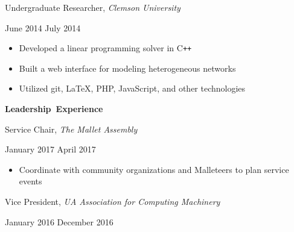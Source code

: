 \documentclass[11pt]{article}
\begin{document}
\begin{minipage}[t]{0.65\textwidth}
\flushleft
Undergraduate Researcher, \textit{Clemson University}\\
\end{minipage}
\begin{minipage}[t]{0.30\textwidth}
\flushright
June 2014 \space \textemdash \space July 2014\\
\end{minipage}

\begin{itemize}
  \item Developed a linear programming solver in C\texttt{++}
  \item Built a web interface for modeling heterogeneous networks
  \item Utilized git, \LaTeX, PHP, JavaScript, and other technologies
\end{itemize}

\vspace{0.8em}
\hbox{\large \textbf{Leadership Experience}}

\vspace{0.4em}
\begin{minipage}[t]{0.65\textwidth}
\flushleft
Service Chair, \textit{The Mallet Assembly}\\
\end{minipage}
\begin{minipage}[t]{0.30\textwidth}
\flushright
January 2017 \space \textemdash \space April 2017\\
\end{minipage}

\begin{itemize}
  \item Coordinate with community organizations and Malleteers to plan service events
\end{itemize}

\vspace{0.4em}
\begin{minipage}[t]{0.65\textwidth}
\flushleft
Vice President, \textit{UA Association for Computing Machinery}\\
\end{minipage}
\begin{minipage}[t]{0.30\textwidth}
\flushright
January 2016 \space \textemdash \space December 2016\\
\end{minipage}
\end{document}
